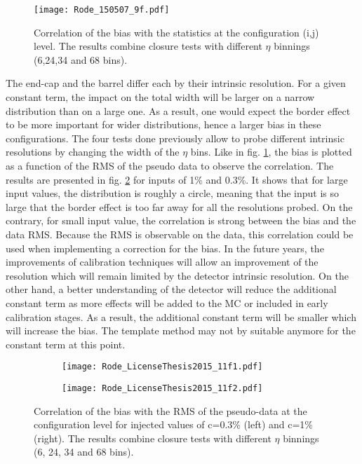 \begin{enumerate}
\begin{figure}[htbp]
\centering
\texttt{[image: Rode\_150507\_9f.pdf]}
\caption{\label{fig:org684acbd}
Correlation of the bias with the statistics at the configuration (i,j) level. The results combine closure tests with different $\eta$ binnings (6,24,34 and 68 bins).\cite{Rode2015}}
\end{figure}

The end-cap and the barrel differ each by their intrinsic resolution.
For a given constant term, the impact on the total width will be larger on a narrow distribution than on a large one.
As a result, one would expect the border effect to be more important for wider distributions, hence a larger bias in these configurations.
The four tests done previously allow to probe different intrinsic resolutions by changing the width of the $\eta$ bins.
Like in fig. \ref{fig:org684acbd}, the bias is plotted as a function of the RMS of the pseudo data to observe the correlation.
The results are presented in fig. \ref{orgddfecd1} for inputs of 1\% and 0.3\%.
It shows that for large input values, the distribution is roughly a circle, meaning that the input is so large that the border effect is too far away for all the resolutions probed.
On the contrary, for small input value, the correlation is strong between the bias and the data RMS.
Because the RMS is observable on the data, this correlation could be used when implementing a correction for the bias.
In the future years, the improvements of calibration techniques will allow an improvement of the resolution which will remain limited by the detector intrinsic resolution.
On the other hand, a better understanding of the detector will reduce the additional constant term as more effects will be added to the MC or included in early calibration stages.
As a result, the additional constant term will be smaller which will increase the bias.
The template method may not by suitable anymore for the constant term at this point.

\begin{figure}
\begin{subfigure}[t]{0.49\linewidth}
\begin{center}
\texttt{[image: Rode\_LicenseThesis2015\_11f1.pdf]}
\end{center}
\end{subfigure}
\begin{subfigure}[t]{0.49\linewidth}
\begin{center}
\texttt{[image: Rode\_LicenseThesis2015\_11f2.pdf]}
\end{center}
\end{subfigure}
\caption{\label{orgddfecd1}
Correlation of the bias with the RMS of the pseudo-data at the configuration level for injected values of c=0.3\% (left) and c=1\% (right). The results combine closure tests with different $\eta$ binnings (6, 24, 34 and 68 bins).\cite{Rode2015}}
\end{figure}






\end{enumerate}
